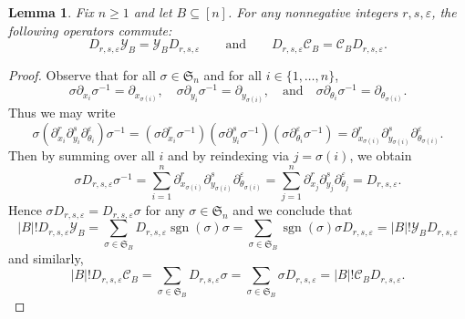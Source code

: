\documentclass[11pt, noadjust, reqno]{amsart}
\newtheorem{lemma}[theorem]{Lemma}
\theoremstyle{definition}
\theoremstyle{remark}
\numberwithin{equation}{section}
\newcommand{\0}{\emptyset}
\renewcommand{\S}{\mathfrak{S}}
\newcommand{\cC}{\mathcal{C}}
\newcommand{\cY}{\mathcal{Y}}
\DeclareMathOperator{\sgn}{sgn}
\begin{document}
\begin{lemma}\label{lem:commuting-operators}
Fix $n \geq 1$ and let $B \subseteq [n]$.
    For any nonnegative integers $r,s,\varepsilon$, the following operators commute:
   \begin{equation*}
        D_{r,s,\varepsilon} \cY_{B} = \cY_{B}D_{r,s,\varepsilon}
        \qquad \text{and}
        \qquad
        D_{r,s,\varepsilon} \cC_{B} = \cC_{B}D_{r,s,\varepsilon}.
    \end{equation*}

\end{lemma}

\begin{proof}
Observe that for all $\sigma \in \mathfrak{S}_n$ and for all $i \in \{1,\ldots,n\}$, 
\[
\sigma \partial_{x_i} \sigma^{-1} = \partial_{x_{\sigma(i)}},
\quad 
\sigma \partial_{y_i} \sigma^{-1} = \partial_{y_{\sigma(i)}},
\quad \text{and}\quad
\sigma \partial_{\theta_i} \sigma^{-1} = \partial_{\theta_{\sigma(i)}}.
\]
Thus we may write
\begin{equation*}
    \sigma (\partial_{x_i}^r \partial_{y_i}^s \partial_{\theta_i}^\varepsilon ) \sigma^{-1} =  (\sigma \partial_{x_i}^r  \sigma^{-1} )(\sigma  \partial_{y_i}^s \sigma^{-1} )( \sigma \partial_{\theta_i}^\varepsilon  \sigma^{-1}) = \partial_{x_{\sigma(i)}}^r\partial_{y_{\sigma(i)}}^s\partial_{\theta_{\sigma(i)}}^\varepsilon.
\end{equation*}
Then by summing over all $i$ and by reindexing via $j = \sigma(i)$, we obtain
\begin{equation*}
    \sigma D_{r,s,\varepsilon} \sigma^{-1} 
    = \sum_{i=1}^n \partial_{x_{\sigma(i)}}^r \partial_{y_{\sigma(i)}}^s \partial_{\theta_{\sigma(i)}}^\varepsilon 
    = \sum_{j=1}^n \partial_{x_j}^r \partial_{y_j}^s \partial_{\theta_j}^\varepsilon = D_{r,s,\varepsilon}.
\end{equation*}
Hence $\sigma D_{r,s,\varepsilon} = D_{r,s,\varepsilon} \sigma$ for any $\sigma \in \S_n$ and we conclude that
\begin{equation*}
|B|! D_{r,s,\varepsilon} \cY_{B} = \sum_{\sigma \in \mathfrak{S}_B} D_{r,s,\varepsilon} \sgn(\sigma) \sigma  = \sum_{\sigma \in \mathfrak{S}_B} \sgn(\sigma) \sigma D_{r,s,\varepsilon}=  |B|! \cY_{B} D_{r,s,\varepsilon}
\end{equation*}
and similarly,
\begin{equation*}
|B|! D_{r,s,\varepsilon} \cC_{B} = \sum_{\sigma \in \mathfrak{S}_B} D_{r,s,\varepsilon}  \sigma  = \sum_{\sigma \in \mathfrak{S}_B}  \sigma D_{r,s,\varepsilon}=  |B|! \cC_{B} D_{r,s,\varepsilon}.
\end{equation*}
\end{proof}
\end{document}
